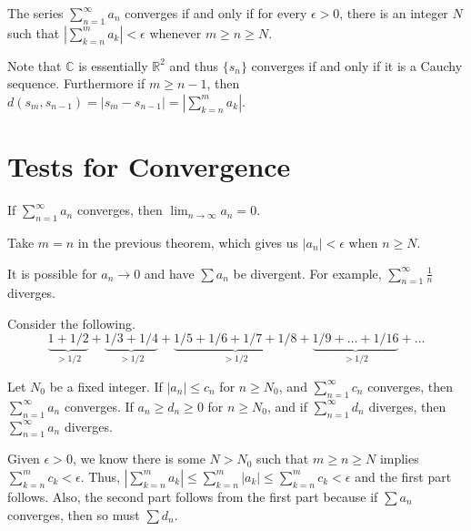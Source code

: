 \documentclass{jacky}
\newcommand{\cc}{\mathbb{C}}
\newcommand{\rr}{\mathbb{R}}
\begin{document}
\begin{prop}
  The series $\sum_{n=1}^\infty a_n$ converges if and only if for every
  $\epsilon>0$, there is an integer $N$ such that $|\sum_{k=n}^m a_k|<\epsilon$
  whenever $m\ge n\ge N$.
\end{prop}

\begin{pf}
  Note that $\cc$ is essentially $\rr^2$ and thus $\{s_n\}$ converges if and
  only if it is a Cauchy sequence. Furthermore if $m\ge n-1$, then
  $d(s_m,s_{n-1})=|s_m-s_{n-1}|=|\sum_{k=n}^m a_k|$.
\end{pf}

\section*{Tests for Convergence}

\begin{prop}
  If $\sum_{n=1}^\infty a_n$ converges, then $\lim_{n\to\infty}a_n=0$.
\end{prop}

\begin{pf}
  Take $m=n$ in the previous theorem, which gives us $|a_n|<\epsilon$ when
  $n\ge N$.
\end{pf}

\begin{note}
  It is possible for $a_n\to0$ and have $\sum a_n$ be divergent. For example,
  $\sum_{n=1}^\infty\frac{1}{n}$ diverges.
\end{note}

\begin{pfi}
  Consider the following.
  $$\underbrace{1+1/2}_{>1/2}+
  \underbrace{1/3+1/4}_{>1/2}+
  \underbrace{1/5+1/6+1/7+1/8}_{>1/2}+
  \underbrace{1/9+\ldots+1/16}_{>1/2}+\ldots$$
\end{pfi}

\begin{thm}
  Let $N_0$ be a fixed integer. If $|a_n|\le c_n$ for $n\ge N_0$, and
  $\sum_{n=1}^\infty c_n$ converges, then $\sum_{n=1}^\infty a_n$ converges. If
  $a_n\ge d_n\ge 0$ for $n\ge N_0$, and if $\sum_{n=1}^\infty d_n$ diverges,
  then $\sum_{n=1}^\infty a_n$ diverges.
\end{thm}

\begin{pf}
  Given $\epsilon>0$, we know there is some $N>N_0$ such that $m\ge n\ge N$
  implies $\sum_{k=n}^mc_k<\epsilon$. Thus,
  $|\sum_{k=n}^ma_k|\le\sum_{k=n}^m|a_k|\le\sum_{k=n}^mc_k<\epsilon$ and the
  first part follows. Also, the second part follows from the first part because
  if $\sum a_n$ converges, then so must $\sum d_n$.
\end{pf}
\end{document}

